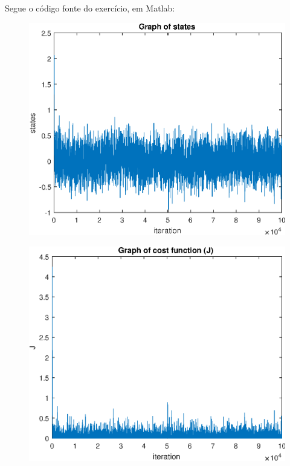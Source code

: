 \documentclass[12pt]{article}
\newenvironment{exercise}[2][Exercício]{\begin{trivlist}
\item[\hskip \labelsep {\bfseries #1}\hskip \labelsep {\bfseries #2.}]}{\end{trivlist}}
\begin{document}
\begin{exercise}{3.a}

Segue o código fonte do exercício, em Matlab:



\begin{figure}[H]
  \centering
  \includegraphics[width=12cm]{figs/ex3_states.eps} 
\end{figure}

\begin{figure}[H]
  \centering
  \includegraphics[width=12cm]{figs/ex3_j.eps} 
\end{figure}
\end{exercise}
\end{document}
